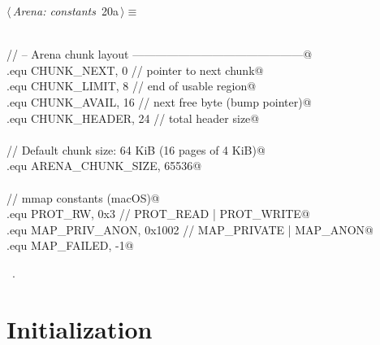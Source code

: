 \documentclass[11pt,a4paper,twoside,openright,DIV=15]{scrbook}
\theoremstyle{definition}
\theoremstyle{plain}
\theoremstyle{remark}
\begin{document}
\begin{flushleft} \small
\begin{minipage}{\linewidth}\label{scrap10}\raggedright\small
{} $\langle\,${\itshape Arena: constants}\nobreak\ {\footnotesize {20a}}$\,\rangle\equiv$
\vspace{-1ex}
\begin{list}{}{} \item
\mbox{}\verb@@\\
\mbox{}\verb@// -- Arena chunk layout ---------------------------------------------@\\
\mbox{}\verb@.equ CHUNK_NEXT,    0         // pointer to next chunk@\\
\mbox{}\verb@.equ CHUNK_LIMIT,   8         // end of usable region@\\
\mbox{}\verb@.equ CHUNK_AVAIL,  16         // next free byte (bump pointer)@\\
\mbox{}\verb@.equ CHUNK_HEADER, 24         // total header size@\\
\mbox{}\verb@@\\
\mbox{}\verb@// Default chunk size: 64 KiB (16 pages of 4 KiB)@\\
\mbox{}\verb@.equ ARENA_CHUNK_SIZE, 65536@\\
\mbox{}\verb@@\\
\mbox{}\verb@// mmap constants (macOS)@\\
\mbox{}\verb@.equ PROT_RW,       0x3      // PROT_READ | PROT_WRITE@\\
\mbox{}\verb@.equ MAP_PRIV_ANON, 0x1002   // MAP_PRIVATE | MAP_ANON@\\
\mbox{}\verb@.equ MAP_FAILED,    -1@\\
\mbox{}\verb@@{\NWsep}
\end{list}
\vspace{-1.5ex}
\footnotesize
\begin{list}{}{\setlength{\itemsep}{-\parsep}\setlength{\itemindent}{-\leftmargin}}
\item \NWtxtMacroRefIn\ .

\item{}
\end{list}
\end{minipage}\vspace{4ex}
\end{flushleft}
\section{Initialization}
\end{document}
